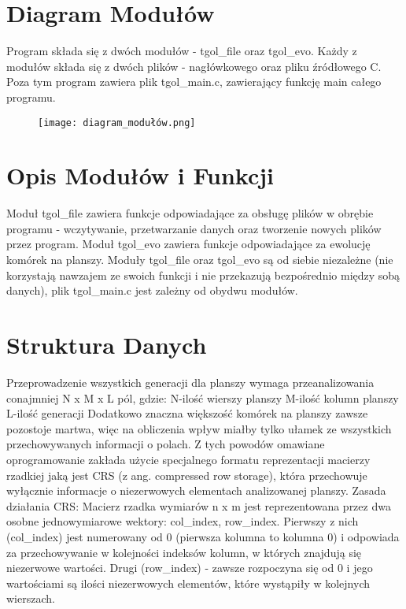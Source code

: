 \documentclass[11pt,a4paper]{report}
\begin{document}
\section{Diagram Modułów}\label{sec:teskt}
Program składa się z dwóch modułów - tgol\_file oraz tgol\_evo.
Każdy z modułów składa się z dwóch plików - nagłówkowego oraz pliku źródłowego C.
Poza tym program zawiera plik tgol\_main.c, zawierający funkcję main całego programu.
\begin{figure}[htbp]
\centerline{\texttt{[image: diagram\_modułów.png]}}
\label{fig}
\end{figure}


\section{Opis Modułów i Funkcji}\label{sec:teskt}
Moduł tgol\_file zawiera funkcje odpowiadające za obsługę plików w obrębie programu - wczytywanie, przetwarzanie danych oraz tworzenie nowych plików przez program.
Moduł tgol\_evo zawiera funkcje odpowiadające za ewolucję komórek na planszy.
Moduły tgol\_file oraz tgol\_evo są od siebie niezależne (nie korzystają nawzajem ze swoich funkcji i nie przekazują bezpośrednio między sobą danych), plik tgol\_main.c jest zależny od obydwu modułów.


\section{Struktura Danych}\label{sec:teskt}
Przeprowadzenie wszystkich generacji dla planszy wymaga przeanalizowania conajmniej N x M x L pól, gdzie:
	N-ilość wierszy planszy
 	M-ilość kolumn planszy
	L-ilość generacji
Dodatkowo znaczna większość komórek na planszy zawsze pozostoje martwa, więc na obliczenia wpływ miałby tylko ułamek ze wszystkich przechowywanych informacji o 
polach. Z tych powodów omawiane oprogramowanie zakłada użycie specjalnego formatu reprezentacji macierzy rzadkiej jaką jest CRS (z ang. compressed row storage), która
przechowuje wyłącznie informacje o niezerwowych elementach analizowanej planszy.
Zasada działania CRS:
Macierz rzadka wymiarów n x m jest reprezentowana przez dwa osobne jednowymiarowe wektory: col\_index, row\_index. Pierwszy z nich (col\_index) jest numerowany od 0 (pierwsza kolumna to kolumna 0) i odpowiada za przechowywanie w kolejności indeksów kolumn,
w których znajdują się niezerwowe wartości. Drugi (row\_index) - zawsze rozpoczyna się od 0 i jego wartościami są ilości niezerwowych elementów, które wystąpiły w  kolejnych wierszach.
\end{document}
